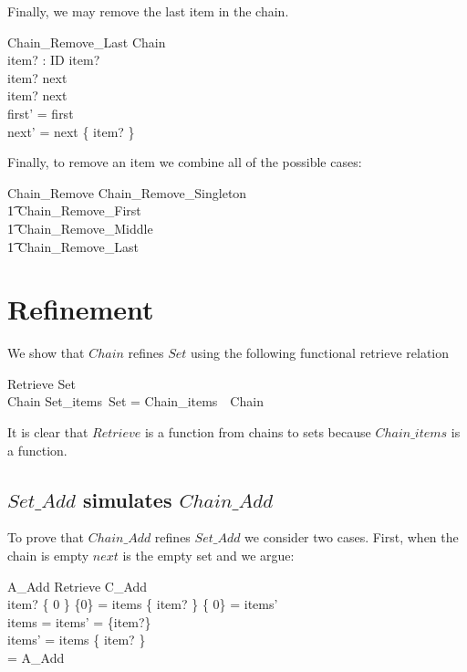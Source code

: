 \documentclass{article}
\begin{document}
Finally, we may remove the last item in the chain.

\begin{schema}{Chain\_Remove\_Last}
	\Delta Chain \\
	item? : ID 
\where
	item?  \\
	item? \notin \dom next \\
	item? \in \ran next \\

	first' = first \\
	next' = next \nrres \{ item? \}
\end{schema}

Finally, to remove an item we combine all of the possible cases:

\begin{zed}
	Chain\_Remove  Chain\_Remove\_Singleton \lor {} \\
\t1		Chain\_Remove\_First \lor {} \\
\t1		Chain\_Remove\_Middle \lor {} \\
\t1		Chain\_Remove\_Last 
\end{zed}

\section{Refinement}

We show that $Chain$ refines $Set$ using the following functional retrieve relation

\begin{schema}{Retrieve}
	Set \\
	Chain
\where
	Set\_items~\theta Set = Chain\_items~\theta~Chain
\end{schema}

It is clear that $Retrieve$ is a function from chains to sets because
$Chain\_items$ is a function.

\subsection{$Set\_Add$ simulates $Chain\_Add$}

To prove that $Chain\_Add$ refines $Set\_Add$ we consider two cases. First, when the chain is empty $next$ is the empty set and we argue:

\begin{argue}
	\pre A\_Add \land \Delta Retrieve \land C\_Add \\
\implies item?  \land \{ 0 \} \setminus \{0\} = items \land \{ item? \} \setminus \{ 0\} = items' \\
\implies items = \emptyset \land items' = \{item?\} \\
\implies items' = items \cup \{ item? \} \\
= A\_Add 
\end{argue}
\end{document}
